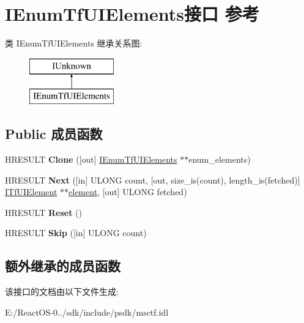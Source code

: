 \hypertarget{interface_i_enum_tf_u_i_elements}{}\section{I\+Enum\+Tf\+U\+I\+Elements接口 参考}
\label{interface_i_enum_tf_u_i_elements}
类 I\+Enum\+Tf\+U\+I\+Elements 继承关系图\+:\begin{figure}[H]
\begin{center}
\leavevmode
\includegraphics[height=2.000000cm]{interface_i_enum_tf_u_i_elements}
\end{center}
\end{figure}
\subsection*{Public 成员函数}
\begin{DoxyCompactItemize}
\item 
\mbox{\label{interface_i_enum_tf_u_i_elements_a05351b5392f83361481e0e415e1cdd8c}} 
H\+R\+E\+S\+U\+LT {\bfseries Clone} (\mbox{[}out\mbox{]} \hyperlink{interface_i_enum_tf_u_i_elements}{I\+Enum\+Tf\+U\+I\+Elements} $\ast$$\ast$enum\+\_\+elements)
\item 
\mbox{\label{interface_i_enum_tf_u_i_elements_a888755ea79cfb31e7cde37f28a4cf79e}} 
H\+R\+E\+S\+U\+LT {\bfseries Next} (\mbox{[}in\mbox{]} U\+L\+O\+NG count, \mbox{[}out, size\+\_\+is(count), length\+\_\+is(fetched)\mbox{]} \hyperlink{interface_i_tf_u_i_element}{I\+Tf\+U\+I\+Element} $\ast$$\ast$\hyperlink{structelement}{element}, \mbox{[}out\mbox{]} U\+L\+O\+NG fetched)
\item 
\mbox{\label{interface_i_enum_tf_u_i_elements_a780e552c5c300931e3d15744a0060c5b}} 
H\+R\+E\+S\+U\+LT {\bfseries Reset} ()
\item 
\mbox{\label{interface_i_enum_tf_u_i_elements_a17d4b6815766b569dd1590d074bd29d7}} 
H\+R\+E\+S\+U\+LT {\bfseries Skip} (\mbox{[}in\mbox{]} U\+L\+O\+NG count)
\end{DoxyCompactItemize}
\subsection*{额外继承的成员函数}


该接口的文档由以下文件生成\+:\begin{DoxyCompactItemize}
\item 
E\+:/\+React\+O\+S-\/0../sdk/include/psdk/msctf.\+idl\end{DoxyCompactItemize}
